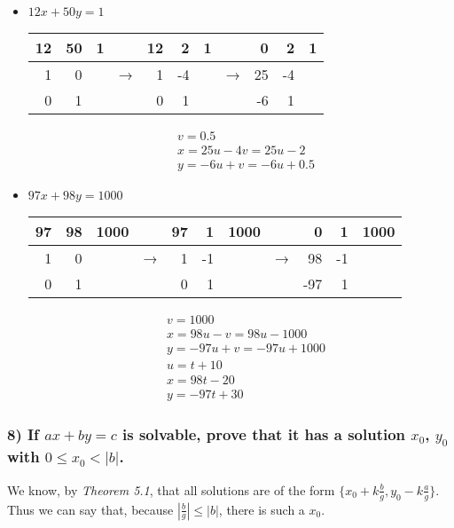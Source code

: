 \documentclass[11pt]{article}
\begin{document}
\begin{itemize}
\item \(12x + 50y = 1\)
\label{sec:org000a390}

\begin{center}
\begin{tabular}{rrrlrrrlrrr}
12 & 50 & 1 &  & 12 & 2 & 1 &  & 0 & 2 & 1\\
\hline
1 & 0 &  & → & 1 & -4 &  & → & 25 & -4 & \\
0 & 1 &  &  & 0 & 1 &  &  & -6 & 1 & \\
\end{tabular}
\end{center}


\setcounter{equation}{0}
\begin{eqnarray}
  &v = 0.5 \\ 
  &x = 25u - 4v = 25u - 2 \\
  &y = -6u + v = -6u + 0.5 
\end{eqnarray}

\item \(97x + 98y = 1000\)
\label{sec:org5d1d7d0}

\begin{center}
\begin{tabular}{rrrlrrrlrrr}
97 & 98 & 1000 &  & 97 & 1 & 1000 &  & 0 & 1 & 1000\\
\hline
1 & 0 &  & → & 1 & -1 &  & → & 98 & -1 & \\
0 & 1 &  &  & 0 & 1 &  &  & -97 & 1 & \\
\end{tabular}
\end{center}


\setcounter{equation}{0}
\begin{eqnarray}
  &v = 1000 \\ 
  &x = 98u - v = 98u - 1000 \\
  &y = -97u + v = -97u + 1000 \\
  &u = t + 10 \\ 
  &x = 98t - 20 \\
  &y = -97t + 30
\end{eqnarray}
\end{itemize}

\subsubsection*{8) If \(ax + by = c\) is solvable, prove that it has a solution \(x_0\), \(y_0\) with \(0 \le x_0 < |b|\).}
\label{sec:org31bfb71}

We know, by \emph{Theorem 5.1}, that all solutions are of the form \(\{x_0 + k\frac{b}{g}, y_0 - k\frac{a}{g}\}\). Thus we can say that, because \(|\frac{b}{g}| \le |b|\), there is such a \(x_0\).
\end{document}
